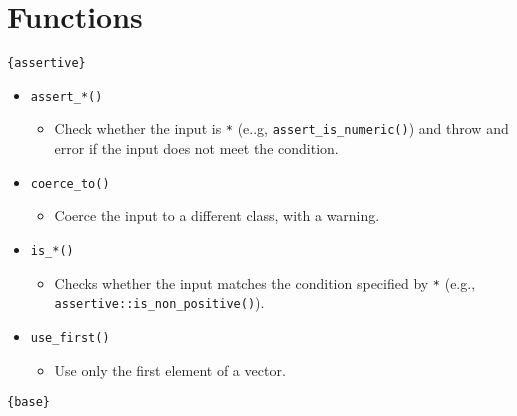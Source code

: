 \documentclass[
]{book}
\providecommand{\tightlist}{%
  \setlength{\itemsep}{0pt}\setlength{\parskip}{0pt}}
\begin{document}
\hypertarget{functions}{%
\section{Functions}\label{functions}}

\texttt{\{assertive\}}

\begin{itemize}
\tightlist
\item
  \texttt{assert\_*()}

  \begin{itemize}
  \tightlist
  \item
    Check whether the input is \texttt{*} (e..g, \texttt{assert\_is\_numeric()}) and throw and error if the input does not meet the condition.
  \end{itemize}
\item
  \texttt{coerce\_to()}

  \begin{itemize}
  \tightlist
  \item
    Coerce the input to a different class, with a warning.
  \end{itemize}
\item
  \texttt{is\_*()}

  \begin{itemize}
  \tightlist
  \item
    Checks whether the input matches the condition specified by \texttt{*} (e.g., \texttt{assertive::is\_non\_positive()}).
  \end{itemize}
\item
  \texttt{use\_first()}

  \begin{itemize}
  \tightlist
  \item
    Use only the first element of a vector.
  \end{itemize}
\end{itemize}

\texttt{\{base\}}
\end{document}

